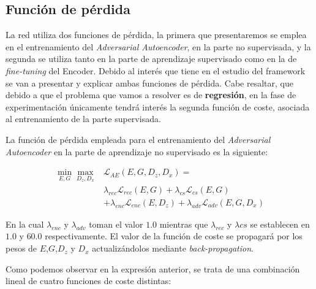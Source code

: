         \subsection{Función de pérdida}

            \noindent La red utiliza dos funciones de pérdida, la primera que presentaremos se emplea en el entrenamiento del \textit{Adversarial Autoencoder}, en la parte no supervisada, y la segunda se utiliza tanto en la parte de aprendizaje supervisado como en la de \textit{fine-tuning} del Encoder. Debido al interés que tiene en el estudio del framework se van a presentar y explicar ambas funciones de pérdida. Cabe resaltar, que debido a que el problema que vamos a resolver es de \textbf{regresión}, en la fase de experimentación únicamente tendrá interés la segunda función de coste, asociada al entrenamiento de la parte supervisada.

            \medskip

            \noindent La función de pérdida empleada para el entrenamiento del \textit{Adversarial Autoencoder} en la parte de aprendizaje no supervisado es la siguiente: 
            
            \begin{align*}
                \min_{E,G} \max_{D_z,D_x} & \mathcal{L}_{AE}(E,G,D_z,D_x) = \\
                & \lambda_{rec} \mathcal{L}_{rec}(E,G) + \lambda_{cs}\mathcal{L}_{cs}(E,G) \\
                & + \lambda_{enc}\mathcal{L}_{enc}(E,D_z)+ \lambda_{adv} \mathcal{L}_{adv}(E,G,D_x)
            \end{align*}

            \noindent En la cual $\lambda_{enc}$ y $\lambda_{adv}$ toman el valor $1.0$ mientras que $\lambda_{rec}$ y $\lambda{cs}$ se establecen en $1.0$ y $60.0$ respectivamente. El valor de la función de coste se propagará por los pesos de $E$,$G$,$D_z$ y $D_x$ actualizándolos mediante \textit{back-propagation}. 

            \medskip

            \noindent Como podemos observar en la expresión anterior, se trata de una combinación lineal de cuatro funciones de coste distintas: 

